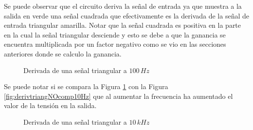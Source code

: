 Se puede observar que el circuito deriva la señal de entrada ya que muestra a la salida en verde una señal cuadrada que efectivamente es la derivada de la señal de entrada triangular amarilla. Notar que la señal cuadrada es positiva en la parte en la cual la señal triangular desciende y esto se debe a que la ganancia se encuentra multiplicada por un factor negativo como se vio en las secciones anteriores donde se calculo la ganancia.

\begin{figure}[H]
	\begin{center}
		\caption{Derivada de una señal triangular a $100 \, Hz$}
		\label{fig:derivtriangNOcomp100Hz}
	\end{center}
\end{figure}

Se puede notar si se compara la Figura \ref{fig:derivtriangNOcomp100Hz} con la Figura \ref{fig:derivtriangNOcomp10Hz} que al aumentar la frecuencia ha aumentado el valor de la tensión en la salida.

\begin{figure}[H]
	\begin{center}
		\caption{Derivada de una señal triangular a $10 \, kHz$}
		\label{fig:derivtriangNOcomp10kHz}
	\end{center}
\end{figure}

